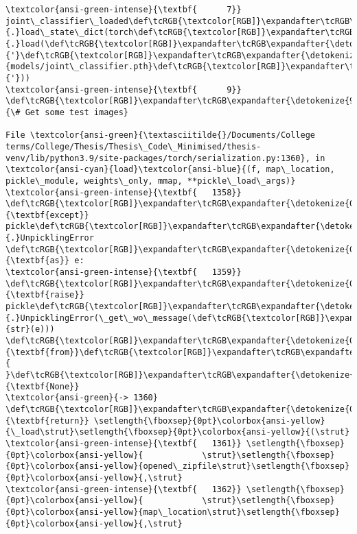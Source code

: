 \documentclass[11pt]{article}
\begin{document}
\begin{Verbatim}[commandchars=\\\{\}, frame=single, framerule=2mm, rulecolor=\color{outerrorbackground}]
\textcolor{ansi-green-intense}{\textbf{      7}} joint\_classifier\_loaded\def\tcRGB{\textcolor[RGB]}\expandafter\tcRGB\expandafter{\detokenize{98,98,98}}{.}load\_state\_dict(torch\def\tcRGB{\textcolor[RGB]}\expandafter\tcRGB\expandafter{\detokenize{98,98,98}}{.}load(\def\tcRGB{\textcolor[RGB]}\expandafter\tcRGB\expandafter{\detokenize{175,0,0}}{'}\def\tcRGB{\textcolor[RGB]}\expandafter\tcRGB\expandafter{\detokenize{175,0,0}}{models/joint\_classifier.pth}\def\tcRGB{\textcolor[RGB]}\expandafter\tcRGB\expandafter{\detokenize{175,0,0}}{'}))
\textcolor{ansi-green-intense}{\textbf{      9}} \def\tcRGB{\textcolor[RGB]}\expandafter\tcRGB\expandafter{\detokenize{95,135,135}}{\# Get some test images}

File \textcolor{ansi-green}{\textasciitilde{}/Documents/College terms/College/Thesis/Thesis\_Code\_Minimised/thesis-venv/lib/python3.9/site-packages/torch/serialization.py:1360}, in \textcolor{ansi-cyan}{load}\textcolor{ansi-blue}{(f, map\_location, pickle\_module, weights\_only, mmap, **pickle\_load\_args)}
\textcolor{ansi-green-intense}{\textbf{   1358}}             \def\tcRGB{\textcolor[RGB]}\expandafter\tcRGB\expandafter{\detokenize{0,135,0}}{\textbf{except}} pickle\def\tcRGB{\textcolor[RGB]}\expandafter\tcRGB\expandafter{\detokenize{98,98,98}}{.}UnpicklingError \def\tcRGB{\textcolor[RGB]}\expandafter\tcRGB\expandafter{\detokenize{0,135,0}}{\textbf{as}} e:
\textcolor{ansi-green-intense}{\textbf{   1359}}                 \def\tcRGB{\textcolor[RGB]}\expandafter\tcRGB\expandafter{\detokenize{0,135,0}}{\textbf{raise}} pickle\def\tcRGB{\textcolor[RGB]}\expandafter\tcRGB\expandafter{\detokenize{98,98,98}}{.}UnpicklingError(\_get\_wo\_message(\def\tcRGB{\textcolor[RGB]}\expandafter\tcRGB\expandafter{\detokenize{0,135,0}}{str}(e))) \def\tcRGB{\textcolor[RGB]}\expandafter\tcRGB\expandafter{\detokenize{0,135,0}}{\textbf{from}}\def\tcRGB{\textcolor[RGB]}\expandafter\tcRGB\expandafter{\detokenize{188,188,188}}{ }\def\tcRGB{\textcolor[RGB]}\expandafter\tcRGB\expandafter{\detokenize{0,135,0}}{\textbf{None}}
\textcolor{ansi-green}{-> 1360}         \def\tcRGB{\textcolor[RGB]}\expandafter\tcRGB\expandafter{\detokenize{0,135,0}}{\textbf{return}} \setlength{\fboxsep}{0pt}\colorbox{ansi-yellow}{\_load\strut}\setlength{\fboxsep}{0pt}\colorbox{ansi-yellow}{(\strut}
\textcolor{ansi-green-intense}{\textbf{   1361}} \setlength{\fboxsep}{0pt}\colorbox{ansi-yellow}{            \strut}\setlength{\fboxsep}{0pt}\colorbox{ansi-yellow}{opened\_zipfile\strut}\setlength{\fboxsep}{0pt}\colorbox{ansi-yellow}{,\strut}
\textcolor{ansi-green-intense}{\textbf{   1362}} \setlength{\fboxsep}{0pt}\colorbox{ansi-yellow}{            \strut}\setlength{\fboxsep}{0pt}\colorbox{ansi-yellow}{map\_location\strut}\setlength{\fboxsep}{0pt}\colorbox{ansi-yellow}{,\strut}

\end{Verbatim}
\end{document}
